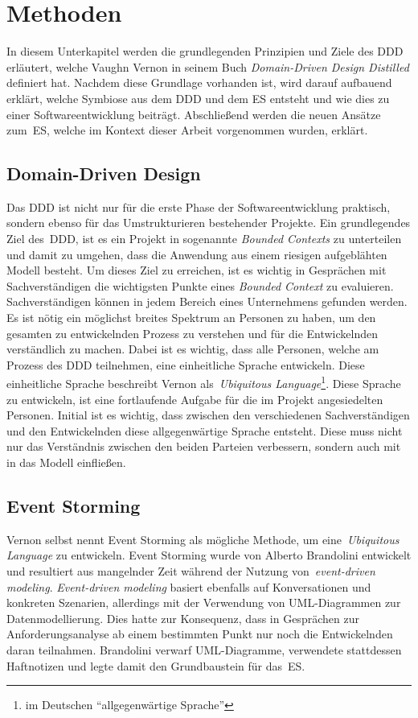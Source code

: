 \section{Methoden}\label{sec:event-storming}
In diesem Unterkapitel werden die grundlegenden Prinzipien und Ziele des \ac{DDD} erläutert, welche Vaughn Vernon in seinem Buch
\textit{Domain-Driven Design Distilled} definiert hat\cite*{dddd}.
Nachdem diese Grundlage vorhanden ist, wird darauf aufbauend erklärt, welche Symbiose aus dem \ac{DDD} und dem \ac{ES} entsteht und wie
dies zu einer Softwareentwicklung beiträgt.
Abschließend werden die neuen Ansätze zum~\ac{ES}, welche im Kontext dieser Arbeit vorgenommen wurden, erklärt.

\subsection{Domain-Driven Design}\label{subsec:domain-driven-design}
Das \ac*{DDD} ist nicht nur für die erste Phase der Softwareentwicklung praktisch, sondern ebenso für das Umstrukturieren bestehender Projekte.
Ein grundlegendes Ziel des~\ac{DDD}, ist es ein Projekt in sogenannte \textit{Bounded Contexts} zu unterteilen und damit zu umgehen, dass
die Anwendung aus einem riesigen aufgeblähten Modell besteht.
Um dieses Ziel zu erreichen, ist es wichtig in Gesprächen mit Sachverständigen die wichtigsten Punkte eines \textit{Bounded Context} zu evaluieren.
Sachverständigen können in jedem Bereich eines Unternehmens gefunden werden.
Es ist nötig ein möglichst breites Spektrum an Personen zu haben, um den gesamten zu entwickelnden Prozess zu verstehen und für die Entwickelnden verständlich zu machen.
Dabei ist es wichtig, dass alle Personen, welche am Prozess des \ac{DDD} teilnehmen, eine einheitliche Sprache entwickeln.
Diese einheitliche Sprache beschreibt Vernon als~\textit{Ubiquitous Language}\footnote{im Deutschen ``allgegenwärtige Sprache''}\cite*{dddd}.
Diese Sprache zu entwickeln, ist eine fortlaufende Aufgabe für die im Projekt angesiedelten Personen.
Initial ist es wichtig, dass zwischen den verschiedenen Sachverständigen und den Entwickelnden diese allgegenwärtige Sprache entsteht.
Diese muss nicht nur das Verständnis zwischen den beiden Parteien verbessern, sondern auch mit in das Modell einfließen.

\subsection{Event Storming}\label{subsec:allgemein}
Vernon selbst nennt Event Storming als mögliche Methode, um eine~\textit{Ubiquitous Language}\cite*{dddd} zu entwickeln.
Event Storming wurde von Alberto Brandolini entwickelt und resultiert aus mangelnder Zeit während der Nutzung von~\textit{event-driven modeling}.
\textit{Event-driven modeling} basiert ebenfalls auf Konversationen und konkreten Szenarien, allerdings mit der Verwendung von \ac{UML}-Diagrammen zur Datenmodellierung.
Dies hatte zur Konsequenz, dass in Gesprächen zur Anforderungsanalyse ab einem bestimmten Punkt nur noch die Entwickelnden daran teilnahmen.
Brandolini verwarf \ac{UML}-Diagramme, verwendete stattdessen Haftnotizen und legte damit den Grundbaustein für das~\ac{ES}\cite*{dddd}.

